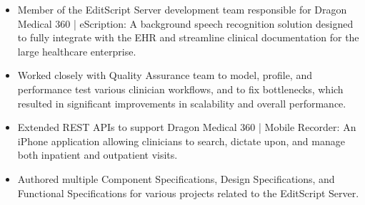 \documentclass[11pt,letterpaper,roman]{moderncv} %
\begin{document}
{\begin{itemize}
\item Member of the EditScript Server development team responsible for Dragon Medical 360 | eScription: A background speech recognition solution designed to fully integrate with the EHR and streamline clinical documentation for the large healthcare enterprise. 
\item Worked closely with Quality Assurance team to model, profile, and performance test various clinician workflows, and to fix bottlenecks, which resulted in significant improvements in scalability and overall performance.
\item Extended REST APIs to support Dragon Medical 360 | Mobile Recorder: An iPhone application allowing clinicians to search, dictate upon, and manage both inpatient and outpatient visits.
\item Authored multiple Component Specifications, Design Specifications, and Functional Specifications for various projects related to the EditScript Server.
\end{itemize}
}
\end{document}
